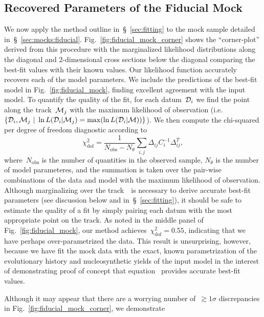 \documentclass[ms.tex]{subfiles}
\begin{document}
\subsection{Recovered Parameters of the Fiducial Mock}
\label{sec:mocks:recovered}

We now apply the method outline in~\S~\ref{sec:fitting} to the mock sample
detailed in~\S~\ref{sec:mocks:fiducial}.
Fig.~\ref{fig:fiducial_mock_corner} shows the ``corner-plot'' derived from this
procedure with the marginalized likelihood distributions along the diagonal and
2-dimensional cross sections below the diagonal comparing the best-fit values
with their known values.
Our likelihood function accurately recovers each of the model parameters.
We include the predictions of the best-fit model in Fig.~\ref{fig:fiducial_mock},
finding excellent agreement with the input model.
To quantify the quality of the fit, for each datum~$\mathcal{D}_i$ we find the
point along the track~$\mathcal{M}_j$ with the maximum likelihood of observation
(i.e.~$\{\mathcal{D}_i,\mathcal{M}_j~|~\ln L(\mathcal{D}_i | \mathcal{M}_j) =
\max(\ln L(\mathcal{D}_i | \mathcal{M}))\}$).
We then compute the chi-squared per degree of freedom diagnostic according to
\begin{equation}
\chi_\text{dof}^2 = \frac{1}{N_\text{obs} - N_\theta}
\sum_{i,j} \Delta_{ij} C_i^{-1} \Delta_{ij}^T,
\label{eq:chisquared_dof}
\end{equation}
where~$N_\text{obs}$ is the number of quantities in the observed sample,
$N_\theta$ is the number of model parameteres, and the summation is taken over
the pair-wise combinations of the data and model with the maximum likelihood of
observation.
Although marginalizing over the track~~is necessary to derive
accurate best-fit parameters (see discussion below and in~\S~\ref{sec:fitting}),
it should be safe to estimate the quality of a fit by simply pairing each datum
with the most appropriate point on the track.
As noted in the middle panel of Fig.~\ref{fig:fiducial_mock}, our method
achieves~$\chi_\text{dof}^2 = 0.55$, indicating that we have perhaps
over-parametrized the data.
This result is unsurprising, however, because we have fit the mock data with
the exact, known parametrization of the evolutionary history and
nucleosynthetic yields of the input model in the interest of demonstrating
proof of concept that equation~ provides accurate best-fit
values.
\par
Although it may appear that there are a worrying number of~$\gtrsim 1\sigma$
discrepancies in Fig.~\ref{fig:fiducial_mock_corner}, we demonstrate
\end{document}
